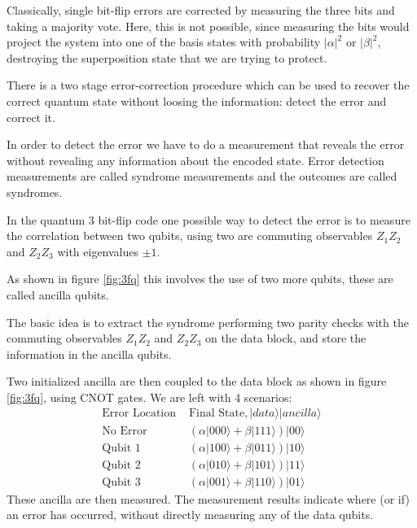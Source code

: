 Classically, single bit-flip errors are corrected by measuring the three bits and taking a majority vote. Here, this is not possible, since measuring the bits would project the system into one of the basis states with probability $|\alpha|^{2}$ or $|\beta|^{2}$,
destroying the superposition state that we are trying to protect. 

There is a two stage error-correction procedure which can be used to recover the correct quantum state without loosing the information: detect the error and correct it.  


In order to detect the error we have to do a measurement that reveals the error without revealing any information about the encoded state.
Error detection measurements are called syndrome measurements and the outcomes are called syndromes. 

In the quantum 3 bit-flip code one possible way to detect the error is to measure the correlation between two qubits, using two are commuting observables $Z_1 Z_2$ and $Z_2 Z_3$ with eigenvalues $\pm 1$.




As shown in figure \ref{fig:3fq} this involves the use of two more qubits, these are called ancilla qubits.

The basic idea is to extract the syndrome performing two parity checks with the commuting observables $Z_1 Z_2$ and $Z_2 Z_3$ on the data block, and store the information in the ancilla qubits. 

Two initialized ancilla are then coupled to the data block as shown in figure \ref{fig:3fq}, using CNOT gates. 
We are left with 4 scenarios: 
\begin{equation*}
    \begin{array}{cc}
         \text{Error Location }& \text{Final State}, |data\rangle|ancilla\rangle \\
         \text{No Error} & (\alpha|000\rangle+\beta|111\rangle)|00\rangle \\
\text{Qubit 1} & (\alpha|100\rangle+\beta|011\rangle)|10\rangle \\
\text{Qubit 2} & (\alpha|010\rangle+\beta|101\rangle)|11\rangle \\
\text{Qubit 3} & (\alpha|001\rangle+\beta|110\rangle)|01\rangle 
    \end{array}
\end{equation*}
These ancilla are then measured. The measurement results indicate where (or if) an error has occurred, without directly measuring any of the data qubits.

